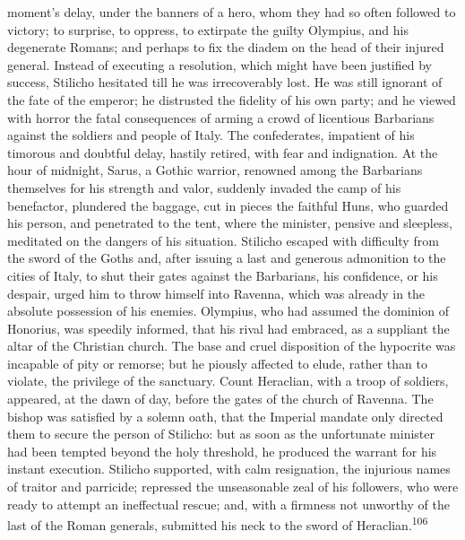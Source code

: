 moment’s delay, under the banners of a hero, whom they had so
often followed to victory; to surprise, to oppress, to extirpate
the guilty Olympius, and his degenerate Romans; and perhaps to
fix the diadem on the head of their injured general. Instead of
executing a resolution, which might have been justified by
success, Stilicho hesitated till he was irrecoverably lost. He
was still ignorant of the fate of the emperor; he distrusted the
fidelity of his own party; and he viewed with horror the fatal
consequences of arming a crowd of licentious Barbarians against
the soldiers and people of Italy. The confederates, impatient of
his timorous and doubtful delay, hastily retired, with fear and
indignation. At the hour of midnight, Sarus, a Gothic warrior,
renowned among the Barbarians themselves for his strength and
valor, suddenly invaded the camp of his benefactor, plundered the
baggage, cut in pieces the faithful Huns, who guarded his person,
and penetrated to the tent, where the minister, pensive and
sleepless, meditated on the dangers of his situation. Stilicho
escaped with difficulty from the sword of the Goths and, after
issuing a last and generous admonition to the cities of Italy, to
shut their gates against the Barbarians, his confidence, or his
despair, urged him to throw himself into Ravenna, which was
already in the absolute possession of his enemies. Olympius, who
had assumed the dominion of Honorius, was speedily informed, that
his rival had embraced, as a suppliant the altar of the Christian
church. The base and cruel disposition of the hypocrite was
incapable of pity or remorse; but he piously affected to elude,
rather than to violate, the privilege of the sanctuary. Count
Heraclian, with a troop of soldiers, appeared, at the dawn of
day, before the gates of the church of Ravenna. The bishop was
satisfied by a solemn oath, that the Imperial mandate only
directed them to secure the person of Stilicho: but as soon as
the unfortunate minister had been tempted beyond the holy
threshold, he produced the warrant for his instant execution.
Stilicho supported, with calm resignation, the injurious names of
traitor and parricide; repressed the unseasonable zeal of his
followers, who were ready to attempt an ineffectual rescue; and,
with a firmness not unworthy of the last of the Roman generals,
submitted his neck to the sword of Heraclian.\textsuperscript{106}



